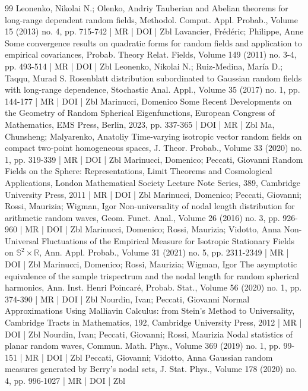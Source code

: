 \begin{thebibliography}{99}
 Leonenko, Nikolai N.; Olenko, Andriy Tauberian and Abelian theorems for long-range dependent random fields, Methodol. Comput. Appl. Probab., Volume 15 (2013) no. 4, pp. 715-742 | MR | DOI | Zbl
 Lavancier, Frédéric; Philippe, Anne Some convergence results on quadratic forms for random fields and application to empirical covariances, Probab. Theory Relat. Fields, Volume 149 (2011) no. 3-4, pp. 493-514 | MR | DOI | Zbl
 Leonenko, Nikolai N.; Ruiz-Medina, María D.; Taqqu, Murad S. Rosenblatt distribution subordinated to Gaussian random fields with long-range dependence, Stochastic Anal. Appl., Volume 35 (2017) no. 1, pp. 144-177 | MR | DOI | Zbl
 Marinucci, Domenico Some Recent Developments on the Geometry of Random Spherical Eigenfunctions, European Congress of Mathematics, EMS Press, Berlin, 2023, pp. 337-365 | DOI | MR | Zbl
 Ma, Chunsheng; Malyarenko, Anatoliy Time-varying isotropic vector random fields on compact two-point homogeneous spaces, J. Theor. Probab., Volume 33 (2020) no. 1, pp. 319-339 | MR | DOI | Zbl
 Marinucci, Domenico; Peccati, Giovanni Random Fields on the Sphere: Representations, Limit Theorems and Cosmological Applications, London Mathematical Society Lecture Note Series, 389, Cambridge University Press, 2011 | MR | DOI | Zbl
 Marinucci, Domenico; Peccati, Giovanni; Rossi, Maurizia; Wigman, Igor Non-universality of nodal length distribution for arithmetic random waves, Geom. Funct. Anal., Volume 26 (2016) no. 3, pp. 926-960 | MR | DOI | Zbl
 Marinucci, Domenico; Rossi, Maurizia; Vidotto, Anna Non-Universal Fluctuations of the Empirical Measure for Isotropic Stationary Fields on $\mathbb{S}^{2}\times \mathbb{R}$, Ann. Appl. Probab., Volume 31 (2021) no. 5, pp. 2311-2349 | MR | DOI | Zbl
 Marinucci, Domenico; Rossi, Maurizia; Wigman, Igor The asymptotic equivalence of the sample trispectrum and the nodal length for random spherical harmonics, Ann. Inst. Henri Poincaré, Probab. Stat., Volume 56 (2020) no. 1, pp. 374-390 | MR | DOI | Zbl
 Nourdin, Ivan; Peccati, Giovanni Normal Approximations Using Malliavin Calculus: from Stein’s Method to Universality, Cambridge Tracts in Mathematics, 192, Cambridge University Press, 2012 | MR | DOI | Zbl
 Nourdin, Ivan; Peccati, Giovanni; Rossi, Maurizia Nodal statistics of planar random waves, Commun. Math. Phys., Volume 369 (2019) no. 1, pp. 99-151 | MR | DOI | Zbl
 Peccati, Giovanni; Vidotto, Anna Gaussian random measures generated by Berry’s nodal sets, J. Stat. Phys., Volume 178 (2020) no. 4, pp. 996-1027 | MR | DOI | Zbl

\end{thebibliography}

